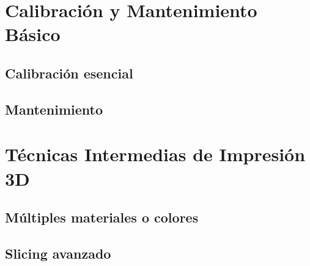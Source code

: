 \section{Calibración y Mantenimiento Básico}

\subsection{Calibración esencial}

\subsection{Mantenimiento}

\section{Técnicas Intermedias de Impresión 3D}

\subsection{Múltiples materiales o colores}

\subsection{Slicing avanzado}

